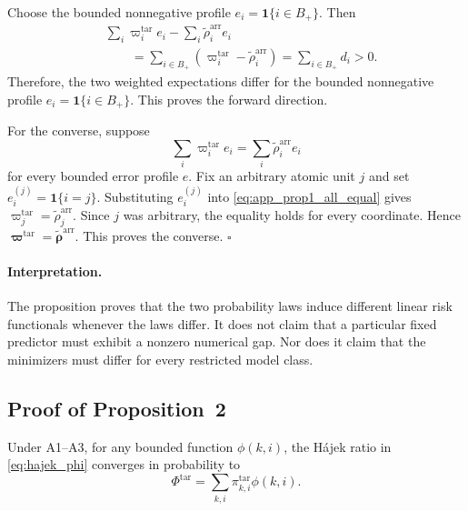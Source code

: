 Choose the bounded nonnegative profile
$e_i=\mathbf{1}\{i\in B_+\}$.
Then
\begin{align}
 &
 \sum_i
 \varpi_i^{\mathrm{tar}}e_i
 -
 \sum_i
 \widetilde\rho_i^{\mathrm{arr}}e_i
 \nonumber\\
 &\qquad=
 \sum_{i\in B_+}
 \left(
 \varpi_i^{\mathrm{tar}}
 -
 \widetilde\rho_i^{\mathrm{arr}}
 \right)
 =
 \sum_{i\in B_+}d_i
 >0.
 \label{eq:app_prop1_difference}
\end{align}
Therefore, the two weighted expectations differ for the bounded nonnegative
profile $e_i=\mathbf{1}\{i\in B_+\}$.  This proves the forward direction.

For the converse, suppose
\begin{equation}
    \sum_i \varpi_i^{\mathrm{tar}}e_i
    =
    \sum_i \widetilde\rho_i^{\mathrm{arr}}e_i
    \label{eq:app_prop1_all_equal}
\end{equation}
for every bounded error profile $e$.  Fix an arbitrary atomic unit $j$ and set
$e_i^{(j)}=\mathbf{1}\{i=j\}$.
Substituting $e_i^{(j)}$ into
\eqref{eq:app_prop1_all_equal} gives
$\varpi_j^{\mathrm{tar}}=\widetilde\rho_j^{\mathrm{arr}}$.
Since $j$ was arbitrary, the equality holds for every coordinate.  Hence
$\boldsymbol\varpi^{\mathrm{tar}}=\widetilde{\boldsymbol\rho}^{\mathrm{arr}}$.
This proves the converse. \hfill$\square$

\paragraph{Interpretation.}
The proposition proves that the two probability laws induce different linear
risk functionals whenever the laws differ.  It does not claim that a particular
fixed predictor must exhibit a nonzero numerical gap.  Nor does it claim that
the minimizers must differ for every restricted model class.


\subsection{Proof of Proposition~2}
\label{app:proof_prop2}

\begin{proposition*}
Under A1--A3, for any bounded function $\phi(k,i)$, the H\'ajek ratio in
\eqref{eq:hajek_phi} converges in probability to
\begin{equation}
    \Phi^{\mathrm{tar}}
    =
    \sum_{k,i}
    \pi^{\mathrm{tar}}_{k,i}\phi(k,i).
    \label{eq:app_target_phi}
\end{equation}
\end{proposition*}

